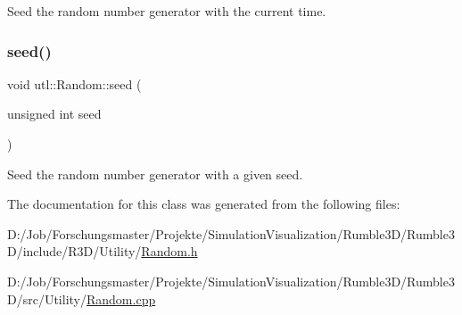 Seed the random number generator with the current time. \mbox{\label{classutl_1_1_random_ac91fc644c7437c700f2c1addeb65125a}} 
\subsubsection{\texorpdfstring{seed()}{seed()}\hspace{0.1cm}{\footnotesize\ttfamily [2/2]}}
{\footnotesize\ttfamily void utl\+::\+Random\+::seed (\begin{DoxyParamCaption}\item[{unsigned int}]{seed }\end{DoxyParamCaption})\hspace{0.3cm}{\ttfamily [static]}}

Seed the random number generator with a given seed. 

The documentation for this class was generated from the following files\+:\begin{DoxyCompactItemize}
\item 
D\+:/\+Job/\+Forschungsmaster/\+Projekte/\+Simulation\+Visualization/\+Rumble3\+D/\+Rumble3\+D/include/\+R3\+D/\+Utility/\mbox{\hyperlink{_random_8h}{Random.\+h}}\item 
D\+:/\+Job/\+Forschungsmaster/\+Projekte/\+Simulation\+Visualization/\+Rumble3\+D/\+Rumble3\+D/src/\+Utility/\mbox{\hyperlink{_random_8cpp}{Random.\+cpp}}\end{DoxyCompactItemize}
